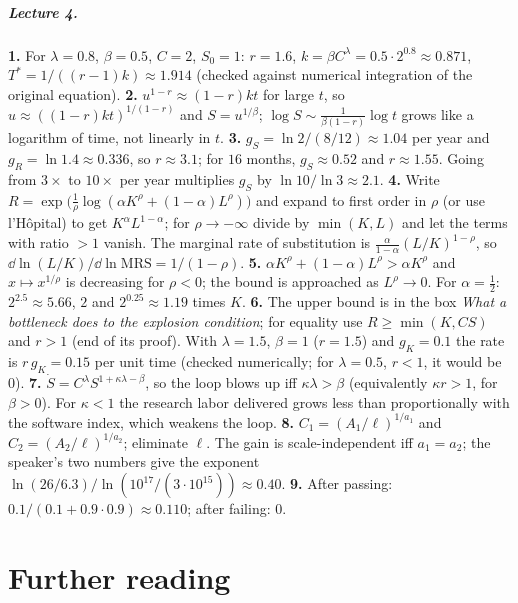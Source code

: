 \paragraph{Lecture 4.}
\textbf{1.} For $\lambda=0.8$, $\beta=0.5$, $C=2$, $S_0=1$: $r=1.6$, $k=\beta C^{\lambda}=0.5\cdot2^{0.8}\approx0.871$, $T^*=1/((r-1)k)\approx1.914$ (checked against numerical integration of the original equation). \quad
\textbf{2.} $u^{1-r}\approx(1-r)kt$ for large $t$, so $u\approx((1-r)kt)^{1/(1-r)}$ and $S=u^{1/\beta}$; $\log S\sim\frac1{\beta(1-r)}\log t$ grows like a logarithm of time, not linearly in $t$. \quad
\textbf{3.} $g_S=\ln2/(8/12)\approx1.04$ per year and $g_R=\ln1.4\approx0.336$, so $r\approx3.1$; for $16$ months, $g_S\approx0.52$ and $r\approx1.55$. Going from $3\times$ to $10\times$ per year multiplies $g_S$ by $\ln10/\ln3\approx2.1$. \quad
\textbf{4.} Write $R=\exp\big(\tfrac1\rho\log(\alpha K^\rho+(1-\alpha)L^\rho)\big)$ and expand to first order in $\rho$ (or use l'H\^opital) to get $K^\alpha L^{1-\alpha}$; for $\rho\to-\infty$ divide by $\min(K,L)$ and let the terms with ratio $>1$ vanish. The marginal rate of substitution is $\frac{\alpha}{1-\alpha}(L/K)^{1-\rho}$, so $\dd\ln(L/K)/\dd\ln\mathrm{MRS}=1/(1-\rho)$. \quad
\textbf{5.} $\alpha K^\rho+(1-\alpha)L^\rho>\alpha K^\rho$ and $x\mapsto x^{1/\rho}$ is decreasing for $\rho<0$; the bound is approached as $L^\rho\to0$. For $\alpha=\frac12$: $2^{2.5}\approx5.66$, $2$ and $2^{0.25}\approx1.19$ times $K$. \quad
\textbf{6.} The upper bound is in the box \emph{What a bottleneck does to the explosion condition}; for equality use $R\ge\min(K,CS)$ and $r>1$ (end of its proof). With $\lambda=1.5$, $\beta=1$ ($r=1.5$) and $g_K=0.1$ the rate is $r\,g_K=0.15$ per unit time (checked numerically; for $\lambda=0.5$, $r<1$, it would be $0$). \quad
\textbf{7.} $\dot S=C^\lambda S^{1+\kappa\lambda-\beta}$, so the loop blows up iff $\kappa\lambda>\beta$ (equivalently $\kappa r>1$, for $\beta>0$). For $\kappa<1$ the research labor delivered grows less than proportionally with the software index, which weakens the loop. \quad
\textbf{8.} $C_1=(A_1/\ell)^{1/a_1}$ and $C_2=(A_2/\ell)^{1/a_2}$; eliminate $\ell$. The gain is scale-independent iff $a_1=a_2$; the speaker's two numbers give the exponent $\ln(26/6.3)/\ln(10^{17}/(3\cdot10^{15}))\approx0.40$. \quad
\textbf{9.} After passing: $0.1/(0.1+0.9\cdot0.9)\approx0.110$; after failing: $0$.
\normalsize

\chapter*{Further reading}
